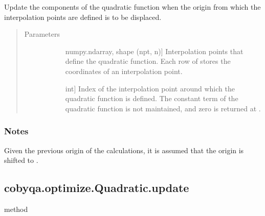 \documentclass[letterpaper,10pt,english]{sphinxmanual}
\begin{document}
\begin{fulllineitems}
\begin{fulllineitems}
\label{\detokenize{refs/generated/cobyqa.optimize.Quadratic.shift_interpolation_points:cobyqa.optimize.Quadratic.shift_interpolation_points}}
\sphinxAtStartPar
Update the components of the quadratic function when the origin from
which the interpolation points are defined is to be displaced.
\begin{quote}\begin{description}
\item[{Parameters}] \leavevmode\begin{description}
\item[{}] \leavevmode{[}numpy.ndarray, shape (npt, n){]}
\sphinxAtStartPar
Interpolation points that define the quadratic function. Each row of
 stores the coordinates of an interpolation point.

\item[{}] \leavevmode{[}int{]}
\sphinxAtStartPar
Index of the interpolation point around which the quadratic function
is defined. The constant term of the quadratic function is not
maintained, and zero is returned at .

\end{description}

\end{description}\end{quote}
\subsubsection*{Notes}

\sphinxAtStartPar
Given  the previous origin of the calculations, it is assumed
that the origin is shifted to .

\end{fulllineitems}



\subsection{cobyqa.optimize.Quadratic.update}
\label{\detokenize{refs/generated/cobyqa.optimize.Quadratic.update:cobyqa-optimize-quadratic-update}}\label{\detokenize{refs/generated/cobyqa.optimize.Quadratic.update::doc}}
\sphinxAtStartPar
method


\end{fulllineitems}
\end{document}
